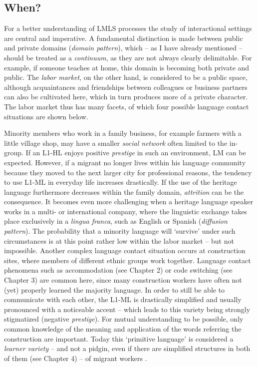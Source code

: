 \documentclass[output=paper,
modfonts
]{langscibook}
\begin{document}
\subsection*{When?}

For a better understanding of LMLS processes the study of interactional settings are central and imperative. A fundamental distinction is made between public and private domains (\emph{domain pattern}), which -- as I have already mentioned -- should be treated as a \emph{continuum}, as they are not always clearly delimitable. For example, if someone teaches at home, this domain is becoming both private and public. The \emph{labor market}, on the other hand, is considered to be a public space, although acquaintances and friendships between colleagues or business partners can also be cultivated here, which in turn produces more of a private character. The labor market thus has many facets, of which four possible language contact situations are shown below.

Minority members who work in a family business, for example farmers with a little village shop, may have a smaller \emph{social network} often limited to the in-group. If an L1-HL enjoys positive \emph{prestige} in such an environment, LM can be expected. However, if a migrant no longer lives within his language community because they moved to the next larger city for professional reasons, the tendency to use L1-ML in everyday life increases drastically. If the use of the heritage language furthermore decreases within the family domain, \emph{attrition} can be the consequence. It becomes even more challenging when a heritage language speaker works in a multi- or international company, where the linguistic exchange takes place exclusively in a \emph{lingua franca}, such as English or Spanish (\emph{diffusion pattern}). The probability that a minority language will ‘survive' under such circumstances is at this point rather low within the labor market -- but not impossible. Another complex language contact situation occurs at construction sites, where members of different ethnic groups work together. Language contact phenomena such as accommodation (see Chapter 2)
or code switching (see Chapter 3)
are common here, since many construction workers have often not (yet) properly learned the majority language. In order to still be able to communicate with each other, the L1-ML is drastically simplified and usually pronounced with a noticeable accent -- which leads to this variety being strongly stigmatized (negative \emph{prestige}). For mutual understanding to be possible, only common knowledge of the meaning and application of the words referring the construction are important. Today this ‘primitive language' is considered a \emph{learner variety} -- and not a pidgin, even if there are simplified structures in both of them (see Chapter 4)
-- of migrant workers \parencite[129-135]{Riehl2014}.
\end{document}
